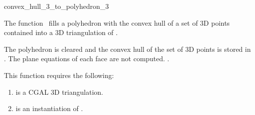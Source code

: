 \begin{ccRefFunction}{convex_hull_3_to_polyhedron_3}

\ccDefinition

The function \ccRefName\ fills a polyhedron with the convex hull
of a set of 3D points contained into a 3D triangulation of \cgal.


{
The polyhedron  is cleared and the convex hull of the set of 3D points is stored in .
The plane equations of each face are not computed.
.
}


This function requires the following:
\begin{enumerate}
   \item {} is a CGAL 3D triangulation.
   \item {} is an instantiation of .
\end{enumerate}



\ccSeeAlso


\end{ccRefFunction}
